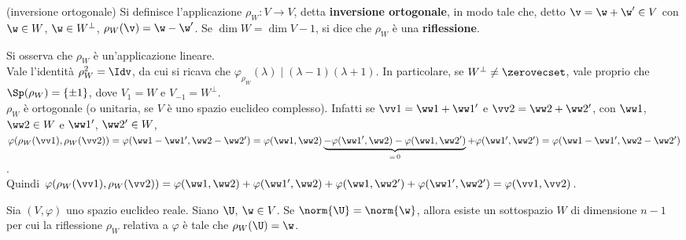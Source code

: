 \documentclass[11pt]{article}
\begin{document}
	\begin{definition} (inversione ortogonale)
		Si definisce l'applicazione $\rho_W : V \to V$, detta \textbf{inversione ortogonale}, in modo tale che, detto $\v = \w + \w' \in V$ con $\w \in W$, $\w \in W^\perp$, $\rho_W(\v) = \w - \w'$. Se $\dim W = \dim V - 1$,
		si dice che $\rho_W$ è una \textbf{riflessione}.
	\end{definition}

	\begin{remark}\nl
		\li Si osserva che $\rho_W$ è un'applicazione lineare. \\
		\li Vale l'identità $\rho_W^2 = \Idv$, da cui si ricava che $\varphi_{\rho_W}(\lambda) \mid (\lambda-1)(\lambda+1)$. In particolare, se $W^\perp \neq \zerovecset$, vale proprio
		che $\Sp(\rho_W) = \{\pm1\}$, dove $V_1 = W$ e $V_{-1} = W^\perp$. \\
		\li $\rho_W$ è ortogonale (o unitaria, se $V$ è uno spazio euclideo complesso). Infatti se $\vv 1 = \ww 1 + \ww 1'$ e $\vv 2 = \ww 2 + \ww 2 '$, con $\ww 1$, $\ww 2 \in W$ e $\ww 1'$, $\ww 2' \in W$, $\varphi(\rho_W(\vv 1), \rho_W(\vv 2)) = \varphi(\ww 1 - \ww 1', \ww 2 - \ww 2') = \varphi(\ww 1, \ww 2) \underbrace{- \varphi(\ww 1', \ww 2) - \varphi(\ww 1, \ww 2')}_{=\,0} + \varphi(\ww 1', \ww 2') =  \varphi(\ww 1 - \ww 1', \ww 2 - \ww 2')$. \\
		
		Quindi $\varphi(\rho_W(\vv 1), \rho_W(\vv 2)) = \varphi(\ww 1, \ww 2) + \varphi(\ww 1', \ww 2) + \varphi(\ww 1, \ww 2') + \varphi(\ww 1', \ww 2') = \varphi(\vv 1, \vv 2)$.
	\end{remark}
	
	\begin{lemma} Sia $(V, \varphi)$ uno spazio euclideo reale.
		Siano $\U$, $\w \in V$. Se $\norm{\U} = \norm{\w}$, allora esiste un sottospazio $W$ di dimensione
		$n-1$ per cui la riflessione $\rho_W$ relativa a $\varphi$ è tale che $\rho_W(\U) = \w$.
	\end{lemma}
	
\end{document}
